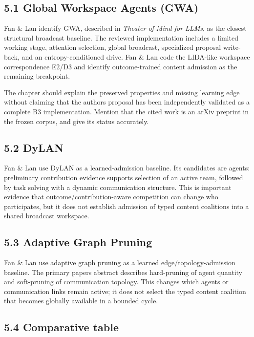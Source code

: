 \subsection{5.1 Global Workspace Agents (GWA)}\label{51-global-workspace-agents-gwa}

Fan \& Lan identify GWA, described in \emph{Theater of Mind for LLMs}, as the closest structural broadcast baseline. The reviewed implementation includes a limited working stage, attention selection, global broadcast, specialized proposal write-back, and an entropy-conditioned drive. Fan \& Lan code the LIDA-like workspace correspondence E2/D3 and identify outcome-trained content admission as the remaining breakpoint.

The chapter should explain the preserved properties and missing learning edge without claiming that the authors\textquotesingle{} proposal has been independently validated as a complete B3 implementation. Mention that the cited work is an arXiv preprint in the frozen corpus, and give its status accurately.

\subsection{5.2 DyLAN}\label{52-dylan}

Fan \& Lan use DyLAN as a learned-admission baseline. Its candidates are agents: preliminary contribution evidence supports selection of an active team, followed by task solving with a dynamic communication structure. This is important evidence that outcome/contribution-aware competition can change who participates, but it does not establish admission of typed content coalitions into a shared broadcast workspace.

\subsection{5.3 Adaptive Graph Pruning}\label{53-adaptive-graph-pruning}

Fan \& Lan use adaptive graph pruning as a learned edge/topology-admission baseline. The primary paper\textquotesingle s abstract describes hard-pruning of agent quantity and soft-pruning of communication topology. This changes which agents or communication links remain active; it does not select the typed content coalition that becomes globally available in a bounded cycle.

\subsection{5.4 Comparative table}\label{54-comparative-table}

